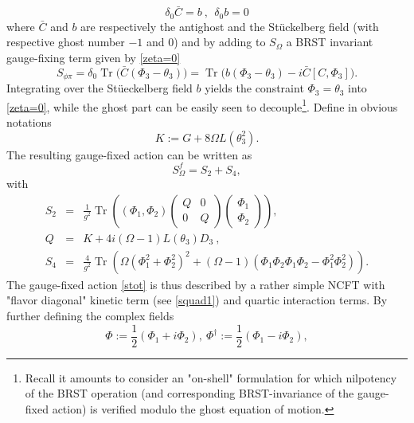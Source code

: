 \documentclass[a4paper,11pt,twoside]{article}
\numberwithin{equation}{section}
\DeclareMathOperator{\tr}{Tr}
\theoremstyle{nonumberplain}
\newcounter{and}
\begin{document}
%
\begin{equation}
\delta_0 {\bar{C}} = b \ , \ \ \delta_0b = 0 \label{contractible-brs}
\end{equation}
%
where ${\bar{C}}$ and $b$ are respectively the antighost and the St\"uckelberg field (with respective ghost number $-1$ and $0$) and by adding to $S_\Omega$ a BRST invariant gauge-fixing term given by \eqref{zeta=0}%
%
\begin{equation}
S_{\phi\pi}=\delta_0\tr\big({\bar{C}}(\Phi_3-\theta_3) \big)=\tr\big(b(\Phi_3-\theta_3)-i{\bar{C}}[C,\Phi_3]\big)\label{gauge-fix}.
\end{equation}
%
Integrating over the St\"ueckelberg field $b$ yields the constraint $\Phi_3=\theta_3$ into \eqref{zeta=0}, while the ghost part can be easily seen to decouple{\footnote{Recall it amounts to consider an "on-shell" formulation for which nilpotency of the BRST operation (and corresponding BRST-invariance of the gauge-fixed action) is verified modulo the ghost equation of motion.}}. Define in obvious notations%
%
\begin{equation}
K:=G+8\Omega L(\theta_3^2)\label{operator-K}.
\end{equation}
%
The resulting gauge-fixed action can be written as%
%
\begin{equation}
S^f_\Omega=S_2+S_4\label{stot},
\end{equation}
with%
\begin{eqnarray}
S_2 &=& \frac{1}{g^2} \tr \left((\Phi_1,\Phi_2)
\begin{pmatrix}
Q&0\\
0&Q
\end{pmatrix} 
\begin{pmatrix}
\Phi_1\\
\Phi_2
\end{pmatrix} 
\right) , \nonumber \\
Q &=& K + 4 i (\Omega-1) L(\theta_3) D_3 \ , \label{squad1} \\[5pt]
S_4 &=& \frac{4}{g^2} \tr \left( \Omega (\Phi_1^2 + \Phi_2^2)^2 + (\Omega-1)(\Phi_1\Phi_2\Phi_1\Phi_2 - \Phi_1^2\Phi_2^2) \right) . \label{squart}
\end{eqnarray}
%
The gauge-fixed action \eqref{stot} is thus described by a rather simple NCFT with "flavor diagonal" kinetic term (see \eqref{squad1}) and quartic interaction terms. By further defining the complex fields%
%
\begin{equation}
\Phi:=\frac{1}{2}(\Phi_1+i\Phi_2),\ \Phi^\dag:=\frac{1}{2}(\Phi_1-i\Phi_2),
\end{equation}
\end{document}
